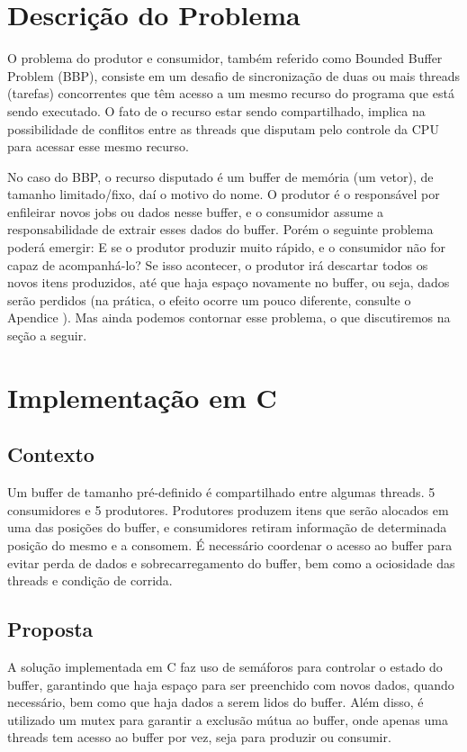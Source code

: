 \documentclass[
	12pt,				%
	openright,			%
	oneside,			%
	a4paper,			%
	chapter=TITLE,		%
	english,			%
	french,				%
	spanish,			%
	brazil				%
	]{abntex2}
\theoremstyle{definition}
\begin{document}
\section{Descrição do Problema}
O problema do produtor e consumidor, também referido como Bounded Buffer Problem (BBP), consiste em um desafio de sincronização de duas ou mais threads (tarefas) concorrentes que têm acesso a um mesmo recurso do programa que está sendo executado. O fato de o recurso estar sendo compartilhado, implica na possibilidade de conflitos entre as threads que disputam pelo controle da CPU para acessar esse mesmo recurso.

No caso do BBP, o recurso disputado é um buffer de memória (um vetor), de tamanho limitado/fixo, daí o motivo do nome. O produtor é o responsável por enfileirar novos jobs ou dados nesse buffer, e o consumidor assume a responsabilidade de extrair esses dados do buffer. Porém o seguinte problema poderá emergir: E se o produtor produzir muito rápido, e o consumidor não for capaz de acompanhá-lo? Se isso acontecer, o produtor irá descartar todos os novos itens produzidos, até que haja espaço novamente no buffer, ou seja, dados serão perdidos (na prática, o efeito ocorre um pouco diferente, consulte o Apendice ). Mas ainda podemos contornar esse problema, o que discutiremos na seção a seguir.

\section{Implementação em C}
\subsection{Contexto}
Um buffer de tamanho pré-definido é compartilhado entre algumas threads. 5 consumidores e 5 produtores. Produtores produzem itens que serão alocados em uma das posições do buffer, e consumidores retiram informação de determinada posição do mesmo e a consomem. É necessário coordenar o acesso ao buffer para evitar perda de dados e sobrecarregamento do buffer, bem como a ociosidade das threads e condição de corrida.
\subsection{Proposta}
A solução implementada em C faz uso de semáforos para controlar o estado do buffer, garantindo que haja espaço para ser preenchido com novos dados, quando necessário, bem como que haja dados a serem lidos do buffer. Além disso, é utilizado um mutex para garantir a exclusão mútua ao buffer, onde apenas uma threads tem acesso ao buffer por vez, seja para produzir ou consumir.
\end{document}
